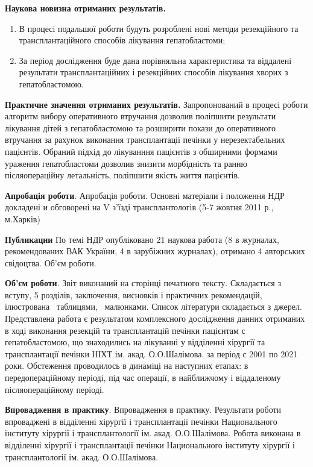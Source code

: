 \textbf{Наукова новизна отриманих результатів.} 
\begin{enumerate}
    \item В процесі подальшої роботи будуть розроблені нові методи резекційного та трансплантаційного способів лікування гепатобластоми;

    \item За період дослідження буде дана порівняльна характеристика та віддалені результати трансплантаційних і резекційних способів лікування хворих з гепатобластомою.
\end{enumerate}

\textbf{Практичне значення отриманих результатів.} 
Запропонований в процесі роботи алгоритм вибору оперативного втручання дозволив поліпшити результати лікування дітей з гепатобластомою та  розширити покази до оперативного втручання за рахунок виконання трансплантації печінки у нерезектабельних пацієнтів. Обраний підхід до лікуванння пацієнтів з обширними формами ураження гепатобластоми дозволив знизити морбідність та ранню післяопераційну летальність, поліпшити якість життя пацієнтів.

\textbf{Апробація роботи}. 
Апробація роботи. Основні матеріали і положення НДР докладені и обговорені на V з'їзді трансплантологів (5-7 жовтня 2011 р., м.Харків) 

\textbf{Публикации} 
По темі НДР опубліковано 21  наукова работа (8 в журналах, рекомендованих ВАК України, 4 в зарубіжних журналах), отримано 4 авторських свідоцтва.
Об'єм роботи. 

\textbf{Об'єм роботи}. 
Звіт виконаний на \pageref{LastPage} сторінці печатного тексту. Складається з вступу, 5 розділів, заключення, висновків і практичних рекомендацій, ілюстрована \tottab\ таблицями, \totfig\ малюнками. Список літератури складається з  джерел. Представлена работа є результатом комплексного дослідження данних отриманих в ході виконання резекцій та трансплантацій печінки пацієнтам с гепатобластомою, що знаходились на лікуванні у відділенні хірургії та трансплантації печінки НІХТ ім. акад. О.О.Шалімова.  за період  с 2001 по 2021 роки.
Обстеження проводилось в динаміці на наступних етапах: в передопераційному періоді, під час операції, в найближчому і віддаленому післяопераційному періоді.

\textbf{Впровадження в практику}. 
Впровадження в практику. Результати роботи впроваджені в відділенні хірургії і трансплантації печінки Национального інституту хірургії і трансплантології ім. акад. О.О.Шалімова.
Робота виконана в відділенні хірургії і трансплантації печінки Национального інституту хірургії і трансплантології ім. акад. О.О.Шалімова.